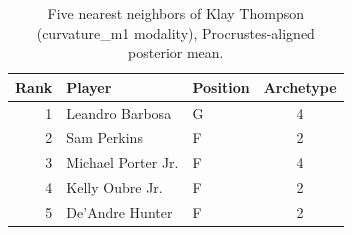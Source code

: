 \begin{table}[htbp]
  \centering\small
  \begin{tabular}{rllc}
    \toprule
    Rank & Player & Position & Archetype \\
    \midrule
    1 & Leandro Barbosa & G & 4 \\
    2 & Sam Perkins & F & 2 \\
    3 & Michael Porter Jr. & F & 4 \\
    4 & Kelly Oubre Jr. & F & 2 \\
    5 & De'Andre Hunter & F & 2 \\
    \bottomrule
  \end{tabular}
  \caption{Five nearest neighbors of Klay Thompson (curvature_m1 modality), Procrustes-aligned posterior mean.}
  \label{tab:Klay_Thompson_neighbors_curvature_m1}
\end{table}

